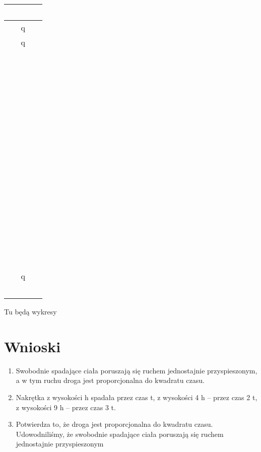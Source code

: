 \documentclass{article}
\begin{document}
\begin{table}[!htbp]
    \centering
    \begin{tabular}{|c|c|c|}
    \hline
        ~ & ~ & ~ \\ \hline
        ~ & q & ~ \\ 
        ~ & q & ~ \\ 
        ~ & ~ & ~ \\ 
        ~ & ~ & ~ \\ 
        ~ & ~ & ~ \\ 
        ~ & ~ & ~ \\ 
        ~ & ~ & ~ \\ 
        ~ & ~ & ~ \\ 
        ~ & ~ & ~ \\ 
        ~ & ~ & ~ \\ 
        ~ & ~ & ~ \\ 
        ~ & ~ & ~ \\ 
        ~ & ~ & ~ \\ 
        ~ & ~ & ~ \\ 
        ~ & ~ & ~ \\ 
        ~ & ~ & ~ \\ 
        ~ & ~ & ~ \\ 
        ~ & q & ~ \\ 
        ~ & ~ & ~ \\ \hline
    \end{tabular}
\end{table}

Tu będą wykresy

\section{Wnioski}

\begin{enumerate}
\item Swobodnie spadające ciała poruszają się ruchem jednostajnie przyspieszonym, a w tym ruchu droga jest proporcjonalna do kwadratu czasu. 
\item Nakrętka z wysokości h spadała przez czas t, z wysokości 4 h – przez czas 2 t, z wysokości 9 h – przez czas 3 t. 
\item Potwierdza to, że droga jest proporcjonalna do kwadratu czasu. 
Udowodniliśmy, że swobodnie spadające ciała poruszają się ruchem jednostajnie przyspieszonym    
\end{enumerate}
\end{document}
